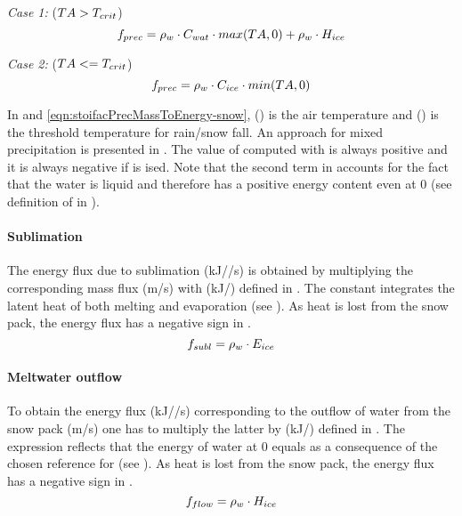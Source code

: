 \medskip\emph{Case 1: } ($TA > T_{crit}$)
\begin{equation}
  f_{prec} = \rho_{w} \cdot C_{wat} \cdot max(TA,0) + \rho_{w} \cdot H_{ice} \label{eqn:stoifacPrecMassToEnergy-rain}
\end{equation}

\medskip\emph{Case 2: } ($TA <= T_{crit}$)
\begin{equation}
  f_{prec} = \rho_{w} \cdot C_{ice} \cdot min(TA,0) \label{eqn:stoifacPrecMassToEnergy-snow}
\end{equation}

In  and \ref{eqn:stoifacPrecMassToEnergy-snow}, \airtemp{} (\celsius) is the air temperature and \airtempRainSnow{} (\celsius) is the threshold temperature for rain/snow fall. An approach for mixed precipitation is presented in \citet{Tarboton1996}. The value of \stoifacPrecMassToEnergy{} computed with  is always positive and it is always negative if  is ised. Note that the second term in  accounts for the fact that the water is liquid and therefore has a positive energy content even at 0\celsius{} (see definition of \snowEnergyContent{} in ).

\paragraph{Sublimation}
The energy flux due to sublimation (kJ/\sqm/s) is obtained by multiplying the corresponding mass flux (m/s) with \stoifacSublMassToEnergy{} (kJ/\cbm) defined in . The constant \sublimHeatIce{} integrates the latent heat of both melting and evaporation (see ). As heat is lost from the snow pack, the energy flux has a negative sign in .
\begin{equation} \label{eqn:stoifacSublMassToEnergy}
  f_{subl} = \rho_{w} \cdot E_{ice}
\end{equation}

\paragraph{Meltwater outflow}
To obtain the energy flux (kJ/\sqm/s) corresponding to the outflow of water from the snow pack (m/s) one has to multiply the latter by \stoifacFlowMassToEnergy{} (kJ/\cbm) defined in . The expression reflects that the energy of water at 0\celsius{} equals \fusionHeatIce{} as a consequence of the chosen reference for \snowEnergyContent{} (see ). As heat is lost from the snow pack, the energy flux has a negative sign in .
\begin{equation} \label{eqn:stoifacFlowMassToEnergy}
  f_{flow}= \rho_{w} \cdot H_{ice}
\end{equation}

